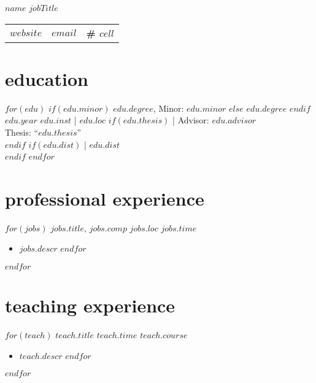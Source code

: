 \documentclass[]{friggeri-cv}
\begin{document}
\header
  {$name$}
  {$jobTitle$}



\vspace{-0.4in}
\hspace{0.35in}
\begin{tabular}{p{7.25cm}p{6cm}p{6cm}}
  \textbf{\href{$website$}{$website$}} &
  \textbf{\href{mailto:$email$}{$email$}} &
  \textbf{\# $cell$}
\end{tabular}



\vspace{-0.05in}

\section{education}
\begin{entrylist}
$for(edu)$
  \entrypub
  $if(edu.minor)$
    {$edu.degree$, Minor: $edu.minor$}
  $else$
    {$edu.degree$}
  $endif$
  {$edu.year$}
  {$edu.inst$ | $edu.loc$}
  $if(edu.thesis)$
    { | Advisor: $edu.advisor$}\\
    {Thesis: ``$edu.thesis$''}\\
  $endif$
  $if(edu.dist)$
    { | $edu.dist$}\\
  $endif$
$endfor$
\end{entrylist}



\vspace{-0.15in}
\section{professional experience}
\begin{entrylist}
$for(jobs)$
  \entryalt
  {\textit{$jobs.title$}, $jobs.comp$}
  {$jobs.loc$}
  {$jobs.time$}
  \setlength\parskip{0pt}
  \begin{itemize}[noitemsep, leftmargin=0.2in]
    $for(jobs.descr)$
      \item $jobs.descr$
    $endfor$
  \end{itemize}
  \setlength\parskip{12pt}
$endfor$
\end{entrylist}



\vspace{-0.05in}
\section{teaching experience}
\begin{entrylist}
$for(teach)$
  \entrypub
  {$teach.title$}
  {$teach.time$}
  {$teach.course$}
  \setlength\parskip{0pt}
  \begin{itemize}[noitemsep, leftmargin=0.2in]
    $for(teach.descr)$
      \item $teach.descr$
    $endfor$
  \end{itemize}
  \setlength\parskip{12pt}
$endfor$
\end{entrylist}
\end{document}
